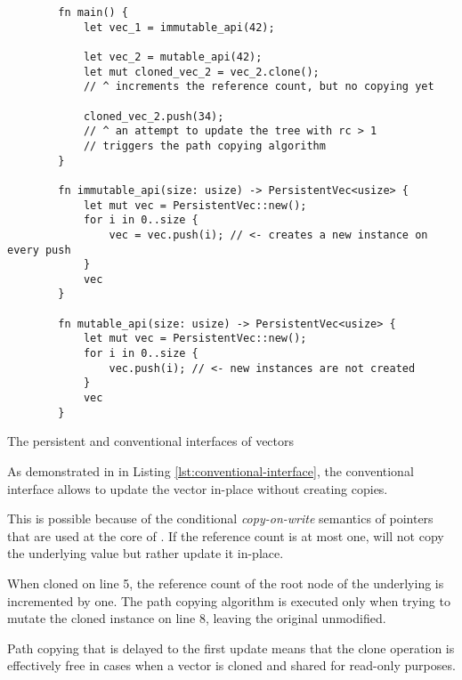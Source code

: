 \begin{listing}[!ht]

    \centering
    \begin{verbatim}
        fn main() {
            let vec_1 = immutable_api(42);

            let vec_2 = mutable_api(42);
            let mut cloned_vec_2 = vec_2.clone();
            // ^ increments the reference count, but no copying yet

            cloned_vec_2.push(34);
            // ^ an attempt to update the tree with rc > 1
            // triggers the path copying algorithm
        }

        fn immutable_api(size: usize) -> PersistentVec<usize> {
            let mut vec = PersistentVec::new();
            for i in 0..size {
                vec = vec.push(i); // <- creates a new instance on every push
            }
            vec
        }

        fn mutable_api(size: usize) -> PersistentVec<usize> {
            let mut vec = PersistentVec::new();
            for i in 0..size {
                vec.push(i); // <- new instances are not created
            }
            vec
        }
    \end{verbatim}

    \caption{The persistent and conventional interfaces of vectors}
    \label{lst:conventional-interface}
\end{listing}

As demonstrated in  in Listing \ref{lst:conventional-interface}, the conventional interface allows to update the vector in-place without creating copies.

This is possible because of the conditional \emph{copy-on-write} semantics of \rc{} pointers that are used at the core of \rrbtree{}. If the reference count is at most one,  will not copy the underlying value but rather update it in-place.

When cloned on line 5, the reference count of the root node of the underlying \rrbtree{} is incremented by one. The path copying algorithm is executed only when trying to mutate the cloned instance on line 8, leaving the original  unmodified.

Path copying that is delayed to the first update means that the clone operation is effectively free in cases when a vector is cloned and shared for read-only purposes.

